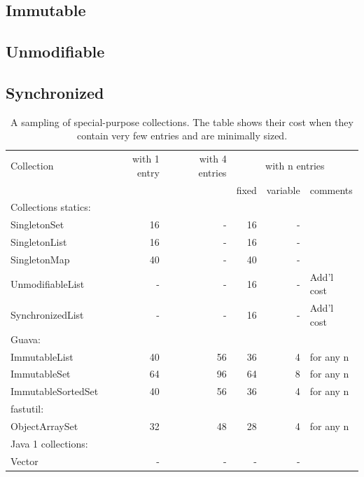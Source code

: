 \subsection{Immutable}
\label{sec:immutable-collections}

\subsection{Unmodifiable}
\label{sec:unmodifiable-collections}

\subsection{Synchronized}
\label{sec:synchronized-collections}

\begin{table}
\centering
 		\begin{tabular}{l||r||r||rrl}
 		\toprule
	 	 Collection & with 1 entry & with 4 entries &
	 	 \multicolumn{3}{c}{with n entries}\\
	 	 & & & fixed & variable & comments \\
	 	 \midrule
	 	\multicolumn{5}{l}{Collections statics:} \\
	 	\midrule
	 	SingletonSet &  16 & - & 16 & - &  \\
	 	SingletonList & 16 & - & 16 & - &  \\
	 	SingletonMap &  40 & - & 40 & - &  \\
	 	\midrule
	 	UnmodifiableList & - & - & 16  & - & Add'l cost \\
	 	SynchronizedList & - & - & 16  & - & Add'l cost \\	 	
	 	\midrule
	 	\multicolumn{5}{l}{Guava:} \\
	 	\midrule
	 	ImmutableList & 40 & 56 & 36 \footnotemark[1] & 4 & for any n \\
	 	ImmutableSet & 64 & 96 & 64 \footnotemark[2] & 8 & for any n \\
	 	ImmutableSortedSet & 40 & 56 & 36 \footnotemark[1] & 4 & for any n \\
	 	 \midrule
	 	\multicolumn{5}{l}{fastutil:} \\
	 	\midrule
	 	ObjectArraySet & 32 & 48 & 28 \footnotemark[1] & 4
	 	& for any n \\
	 	\midrule
	 	\multicolumn{5}{l}{Java 1 collections:} \\
	 	\midrule
	 	Vector & - & - & -  & - & \\ 	
	 	\bottomrule
	 	\end{tabular}
	 	
	\caption{A sampling of special-purpose collections. The table shows their cost
	when they contain very few entries and are minimally sized.}
	\label{tab:specialized-collections-small}
\end{table}

